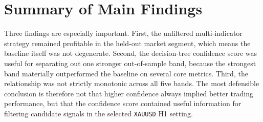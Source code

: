 \section{Summary of Main Findings}

Three findings are especially important. First, the unfiltered multi-indicator
strategy remained profitable in the held-out market segment, which means the
baseline itself was not degenerate. Second, the decision-tree confidence score
was useful for separating out one stronger out-of-sample band, because the
strongest band materially outperformed the baseline on several core metrics.
Third, the
relationship was not strictly monotonic across all five bands. The most
defensible conclusion is therefore not that higher confidence always implied
better trading performance, but that the confidence score contained useful
information for filtering candidate signals in the selected \texttt{XAUUSD} H1
setting.
